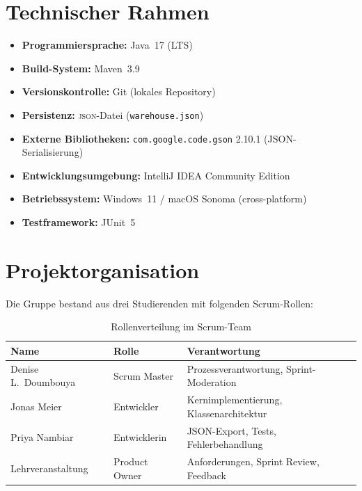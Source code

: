 \documentclass[12pt, a4paper, twoside]{report}
\newcommand{\json}{\textsc{json}}
\begin{document}
\section{Technischer Rahmen}

\begin{itemize}[leftmargin=1.5em]
  \item \textbf{Programmiersprache:} Java~17 (LTS)
  \item \textbf{Build-System:} Maven~3.9
  \item \textbf{Versionskontrolle:} Git (lokales Repository)
  \item \textbf{Persistenz:} \json{}-Datei (\texttt{warehouse.json})
  \item \textbf{Externe Bibliotheken:} \texttt{com.google.code.gson} 2.10.1 (JSON-Serialisierung)
  \item \textbf{Entwicklungsumgebung:} IntelliJ IDEA Community Edition
  \item \textbf{Betriebssystem:} Windows~11 / macOS Sonoma (cross-platform)
  \item \textbf{Testframework:} JUnit~5
\end{itemize}

\section{Projektorganisation}

Die Gruppe bestand aus drei Studierenden mit folgenden Scrum-Rollen:

\begin{table}[H]
  \centering
  \caption{Rollenverteilung im Scrum-Team}
  \label{tab:rollen}
  \begin{tabularx}{0.85\textwidth}{L{4cm} L{3.5cm} L{5cm}}
    \toprule
    \textbf{Name} & \textbf{Rolle} & \textbf{Verantwortung} \\
    \midrule
    Denise L.\ Doumbouya & Scrum Master     & Prozessverantwortung, Sprint-Moderation \\
    Jonas Meier          & Entwickler       & Kernimplementierung, Klassenarchitektur \\
    Priya Nambiar        & Entwicklerin     & JSON-Export, Tests, Fehlerbehandlung \\
    \midrule
    Lehrveranstaltung    & Product Owner    & Anforderungen, Sprint Review, Feedback \\
    \bottomrule
  \end{tabularx}
\end{table}
\end{document}
